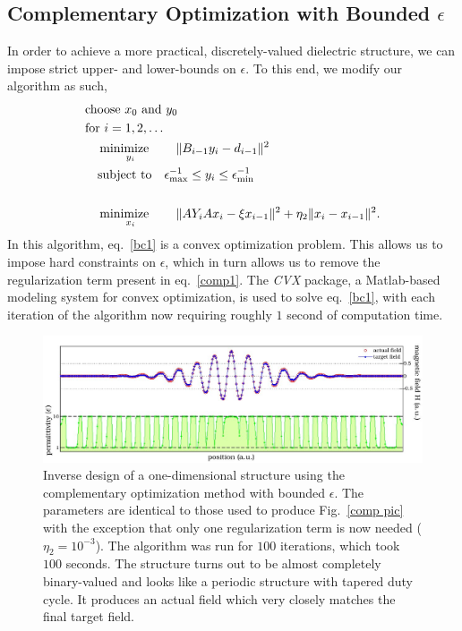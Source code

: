 \subsection{Complementary Optimization with Bounded $\epsilon$}
In order to achieve a more practical, discretely-valued dielectric structure, we can impose strict upper- and lower-bounds on $\epsilon$. To this end, we modify our algorithm as such,
\begin{align}
&\text{choose $x_0$ and $y_0$} \nonumber \\
&\text{for } i = 1, 2, \ldots \nonumber \\
&\quad\operatorname*{\text{minimize}\quad}_{y_i}\quad \|B_{i-1} y_i-d_{i-1}\|^2 \nonumber \\
&\quad\text{subject to}\quad \epsilon_\text{max}^{-1} \leq y_i \leq \epsilon_\text{min}^{-1} \label{bc1} \\
\nonumber \\
&\quad\operatorname*{\text{minimize}\quad}_{x_i}\quad \|A Y_i A x_i - \xi x_{i-1}\|^2 + \eta_2\|x_i-x_{i-1}\|^2. \label{bc2}
\end{align}
In this algorithm, eq.~\eqref{bc1} is a convex optimization problem\cite{BV04}. This allows us to impose hard constraints on $\epsilon$, which in turn allows us to remove the regularization term present in eq.~\eqref{comp1}. The \emph{CVX} package\cite{CVX}, a Matlab-based modeling system for convex optimization, is used to solve eq.~\eqref{bc1}, with each iteration of the algorithm now requiring roughly $1$ second of computation time.
\begin{figure}[htbp]\centering
\includegraphics[width=\textwidth]{p1/bounded}
\caption{Inverse design of a one-dimensional structure using the complementary optimization method with bounded $\epsilon$. The parameters are identical to those used to produce Fig.~\ref{comp pic} with the exception that only one regularization term is now needed ($\eta_2=10^{-3}$). The algorithm was run for $100$ iterations, which took $100$ seconds. The structure turns out to be almost completely binary-valued and looks like a periodic structure with tapered duty cycle. It produces an actual field which very closely matches the final target field.}
\label{bounded comp pic}
\end{figure}

